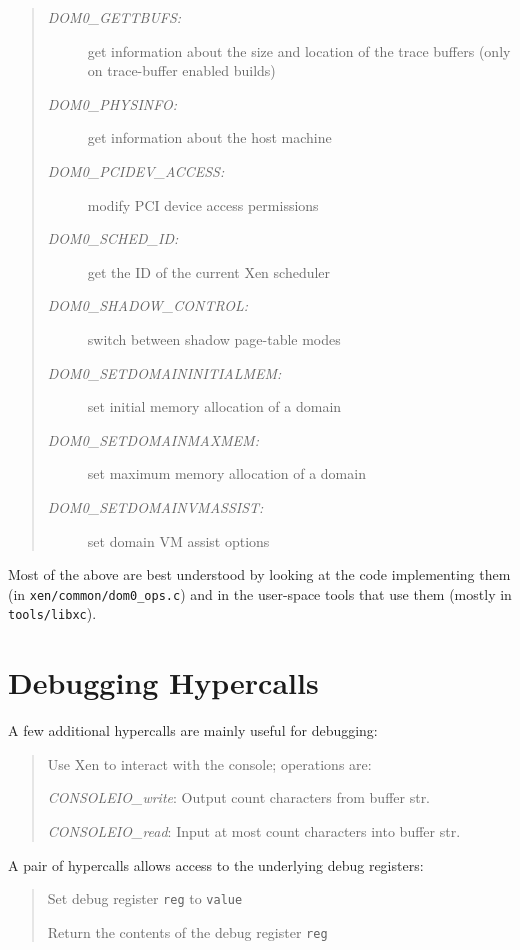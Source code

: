 \documentclass[11pt,twoside,final,openright]{xenstyle}
\begin{document}
\begin{quote}
\begin{description}
\item [\it DOM0\_GETTBUFS:] get information about the size and location of
                      the trace buffers (only on trace-buffer enabled builds)

\item [\it DOM0\_PHYSINFO:] get information about the host machine

\item [\it DOM0\_PCIDEV\_ACCESS:] modify PCI device access permissions

\item [\it DOM0\_SCHED\_ID:] get the ID of the current Xen scheduler

\item [\it DOM0\_SHADOW\_CONTROL:] switch between shadow page-table modes

\item [\it DOM0\_SETDOMAININITIALMEM:] set initial memory allocation of a domain

\item [\it DOM0\_SETDOMAINMAXMEM:] set maximum memory allocation of a domain

\item [\it DOM0\_SETDOMAINVMASSIST:] set domain VM assist options
\end{description} 
\end{quote} 

Most of the above are best understood by looking at the code 
implementing them (in {\tt xen/common/dom0\_ops.c}) and in 
the user-space tools that use them (mostly in {\tt tools/libxc}). 

\section{Debugging Hypercalls} 

A few additional hypercalls are mainly useful for debugging: 

\begin{quote} 

Use Xen to interact with the console; operations are:

{\it CONSOLEIO\_write}: Output count characters from buffer str.

{\it CONSOLEIO\_read}: Input at most count characters into buffer str.
\end{quote} 

A pair of hypercalls allows access to the underlying debug registers: 
\begin{quote}

Set debug register {\tt reg} to {\tt value} 


Return the contents of the debug register {\tt reg}
\end{quote}
\end{document}
